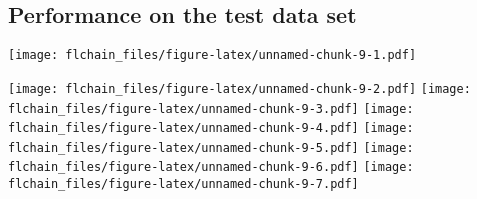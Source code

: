 \documentclass[
]{article}
\newenvironment{Shaded}{\begin{snugshade}}{\end{snugshade}}
\newcommand{\AttributeTok}[1]{\textcolor[rgb]{0.13,0.29,0.53}{#1}}
\newcommand{\FloatTok}[1]{\textcolor[rgb]{0.00,0.00,0.81}{#1}}
\newcommand{\FunctionTok}[1]{\textcolor[rgb]{0.13,0.29,0.53}{\textbf{#1}}}
\newcommand{\NormalTok}[1]{#1}
\newcommand{\OtherTok}[1]{\textcolor[rgb]{0.56,0.35,0.01}{#1}}
\newcommand{\SpecialCharTok}[1]{\textcolor[rgb]{0.81,0.36,0.00}{\textbf{#1}}}
\newcommand{\StringTok}[1]{\textcolor[rgb]{0.31,0.60,0.02}{#1}}
\begin{document}
\hypertarget{performance-on-the-test-data-set}{%
\subsection{Performance on the test data
set}\label{performance-on-the-test-data-set}}

\begin{Shaded}
\end{Shaded}

\texttt{[image: flchain\_files/figure-latex/unnamed-chunk-9-1.pdf]}

\begin{Shaded}
\end{Shaded}

\texttt{[image: flchain\_files/figure-latex/unnamed-chunk-9-2.pdf]}
\texttt{[image: flchain\_files/figure-latex/unnamed-chunk-9-3.pdf]}
\texttt{[image: flchain\_files/figure-latex/unnamed-chunk-9-4.pdf]}
\texttt{[image: flchain\_files/figure-latex/unnamed-chunk-9-5.pdf]}
\texttt{[image: flchain\_files/figure-latex/unnamed-chunk-9-6.pdf]}
\texttt{[image: flchain\_files/figure-latex/unnamed-chunk-9-7.pdf]}
\end{document}
